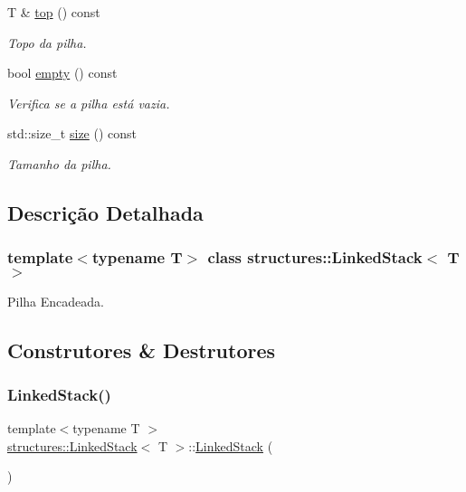 \begin{DoxyCompactItemize}
T \& \hyperlink{classstructures_1_1LinkedStack_a14ab6e3507dd1206a87bba8c57e1733f}{top} () const
\begin{DoxyCompactList}\small\item\em Topo da pilha. \end{DoxyCompactList}\item 
bool \hyperlink{classstructures_1_1LinkedStack_ac9704fd697f9c4ed4f7fc4e786114e4f}{empty} () const
\begin{DoxyCompactList}\small\item\em Verifica se a pilha está vazia. \end{DoxyCompactList}\item 
std\+::size\+\_\+t \hyperlink{classstructures_1_1LinkedStack_ae1ca6a5a9b837471863f1c8bb23cfe1d}{size} () const
\begin{DoxyCompactList}\small\item\em Tamanho da pilha. \end{DoxyCompactList}\end{DoxyCompactItemize}


\subsection{Descrição Detalhada}
\subsubsection*{template$<$typename T$>$\newline
class structures\+::\+Linked\+Stack$<$ T $>$}

Pilha Encadeada. 

\subsection{Construtores \& Destrutores}
\mbox{\label{classstructures_1_1LinkedStack_a546b827cccaa49b4f470110bc3a9004e}} 
\subsubsection{\texorpdfstring{Linked\+Stack()}{LinkedStack()}}
{\footnotesize\ttfamily template$<$typename T $>$ \\
\hyperlink{classstructures_1_1LinkedStack}{structures\+::\+Linked\+Stack}$<$ T $>$\+::\hyperlink{classstructures_1_1LinkedStack}{Linked\+Stack} (\begin{DoxyParamCaption}{ }\end{DoxyParamCaption})}



